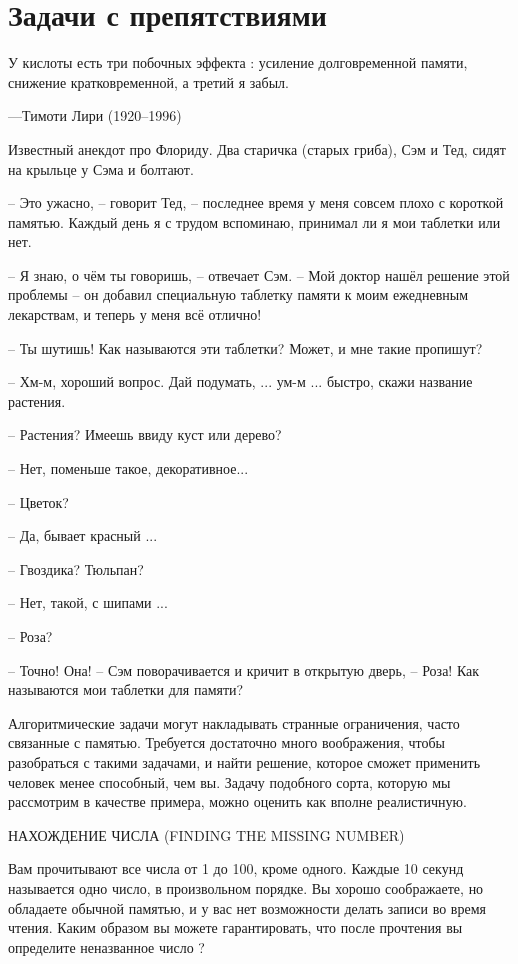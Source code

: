 \chapter*{Задачи с препятствиями}

\setlength{\epigraphwidth}{.6\textwidth}
\epigraph{У кислоты есть три побочных эффекта : усиление долговременной памяти, снижение кратковременной, а третий я забыл.}{---Тимоти Лири (1920--1996)}


Известный анекдот про Флориду.
Два старичка (старых гриба), Сэм и Тед, сидят на крыльце у Сэма и болтают.


-- Это ужасно, -- говорит Тед, -- последнее время у меня совсем плохо с короткой памятью.
Каждый день я с трудом вспоминаю, принимал ли я мои таблетки или нет.

-- Я знаю, о чём ты говоришь, -- отвечает Сэм.
-- Мой доктор нашёл решение этой проблемы -- он добавил специальную таблетку памяти к моим ежедневным лекарствам, и теперь у меня всё отлично!

-- Ты шутишь! Как называются эти таблетки? Может, и мне такие пропишут?

-- Хм-м, хороший вопрос. Дай подумать, ... ум-м ... быстро, скажи название растения.

-- Растения? Имеешь ввиду куст или дерево?

-- Нет, поменьше такое, декоративное...

-- Цветок?

-- Да, бывает красный ...

-- Гвоздика? Тюльпан?

-- Нет, такой, с шипами ...

-- Роза?

-- Точно! Она! -- Сэм поворачивается и кричит в открытую дверь, -- Роза! Как называются мои таблетки для памяти?


Алгоритмические задачи могут накладывать странные ограничения, часто связанные с памятью. Требуется достаточно много воображения, чтобы разобраться с такими задачами, и найти решение, которое сможет применить человек менее способный, чем вы. Задачу подобного сорта, которую мы рассмотрим в качестве примера, можно оценить как вполне реалистичную.

НАХОЖДЕНИЕ ЧИСЛА (FINDING THE MISSING NUMBER)

Вам прочитывают все числа от 1 до 100, кроме одного. Каждые 10 секунд называется одно число, в произвольном порядке. Вы хорошо соображаете, но обладаете обычной памятью, и у вас нет возможности делать записи во время чтения. Каким образом вы можете гарантировать, что после прочтения вы определите неназванное число ?

